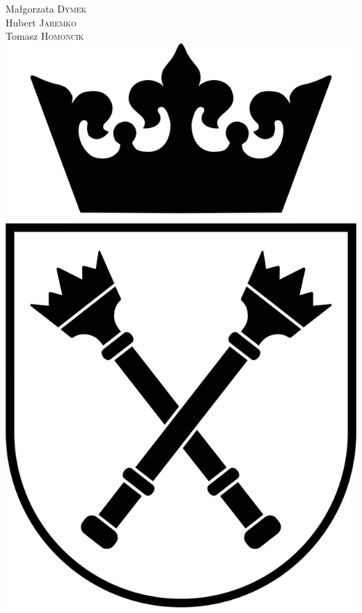 \begin{titlepage}
\Large%
Małgorzata \textsc{Dymek}\\
Hubert \textsc{Jaremko}\\
Tomasz \textsc{Homoncik}\\[2.0cm]


\includegraphics[scale=0.27]{uj.jpg}\\[0.5cm] %
 

\end{titlepage}
